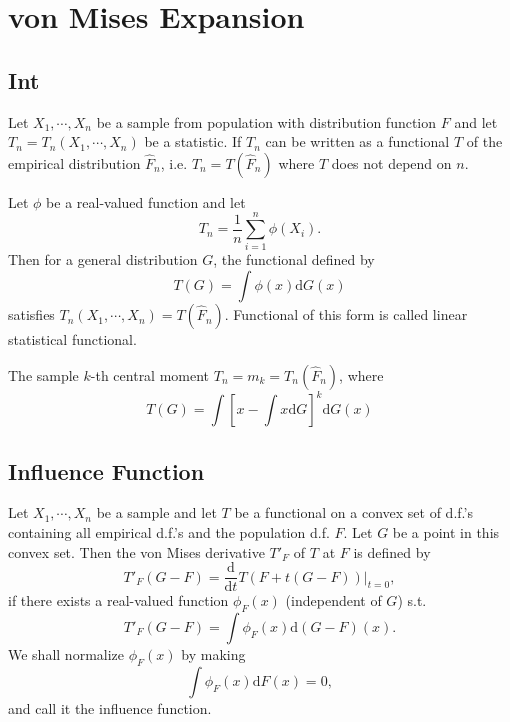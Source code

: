 \chapter{von Mises Expansion}

\section{Int}

\begin{definition}
    Let $X_1,\cdots,X_n$ be a sample from population with distribution function $F$ and let $T_n=T_n(X_1,\cdots,X_n)$ be a 
    statistic. If $T_n$ can be written as a functional $T$ of the empirical distribution $\hat{F}_n$, i.e. $T_n=T(\hat{F}_n)$ where $T$
    does not depend on $n$.
\end{definition}

\begin{example}
    Let $\phi$ be a real-valued function and let 
    \[ T_n=\frac{1}{n}\sum_{i=1}^{n}\phi(X_i).\] 
    Then for a general distribution $G$, the functional defined by 
    \[ T(G)=\int \phi(x) \mathrm{d}G(x) \] 
    satisfies $T_n(X_1,\cdots,X_n)=T(\hat{F}_n)$. Functional of this form is called linear statistical functional.
\end{example}

\begin{example}
    The sample $k$-th central moment $T_n=m_k=T_n(\hat{F}_n)$, where 
    \[ T(G)=\int [x-\int x\mathrm{d}G]^k \mathrm{d}G(x)\]
\end{example}

\section{Influence Function}
\begin{definition}
    Let $X_1,\cdots,X_n$ be a sample and let $T$ be a functional on a convex set of d.f.'s containing all empirical d.f.'s and the population d.f. $F$.
    Let $G$ be a point in this convex set. Then the von Mises derivative $T'_F$ of $T$ at $F$ is defined by 
    \[ T'_F(G-F)=\frac{\mathrm{d}}{\mathrm{d}t} T(F+t(G-F))|_{t=0},\]
    if there exists a real-valued function $\phi_F(x)$ (independent of $G$) s.t. 
    \[ T'_F(G-F)=\int \phi_F(x)\mathrm{d}(G-F)(x).\] 
    We shall normalize $\phi_F(x)$ by making 
    \[\int \phi_F(x)\mathrm{d}F (x)=0 ,\]
    and call it the influence function.
\end{definition}





